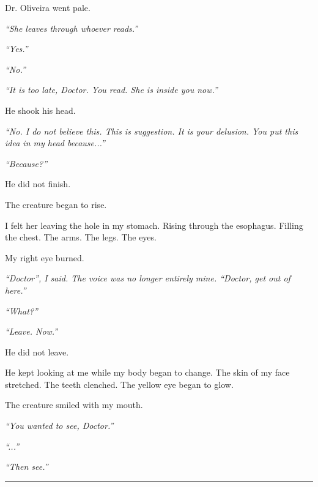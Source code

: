 \noindent Dr. Oliveira went pale.

\noindent \textit{\textquotedblleft{}She leaves through whoever reads.\textquotedblright{}}

\noindent \textit{\textquotedblleft{}Yes.\textquotedblright{}}

\noindent \textit{\textquotedblleft{}No.\textquotedblright{}}

\noindent \textit{\textquotedblleft{}It is too late, Doctor. You read. She is inside you now.\textquotedblright{}}

\noindent He shook his head.

\noindent \textit{\textquotedblleft{}No. I do not believe this. This is suggestion. It is your delusion. You put this idea in my head because...\textquotedblright{}}

\noindent \textit{\textquotedblleft{}Because?\textquotedblright{}}

\noindent He did not finish.

\noindent The creature began to rise.

\noindent I felt her leaving the hole in my stomach. Rising through the esophagus. Filling the chest. The arms. The legs. The eyes.

\noindent My right eye burned.

\noindent \textit{\textquotedblleft{}Doctor\textquotedblright{}\textit{, I said. The voice was no longer entirely mine. }\textquotedblleft{}Doctor, get out of here.\textquotedblright{}}

\noindent \textit{\textquotedblleft{}What?\textquotedblright{}}

\noindent \textit{\textquotedblleft{}Leave. Now.\textquotedblright{}}

\noindent He did not leave.

\noindent He kept looking at me while my body began to change. The skin of my face stretched. The teeth clenched. The yellow eye began to glow.

\noindent The creature smiled with my mouth.

\noindent \textit{\textquotedblleft{}You wanted to see, Doctor.\textquotedblright{}}

\noindent \textit{\textquotedblleft{}...\textquotedblright{}}

\noindent \textit{\textquotedblleft{}Then see.\textquotedblright{}}

\vspace{0.5em}\noindent\rule{\textwidth}{0.5pt}\vspace{0.5em}

